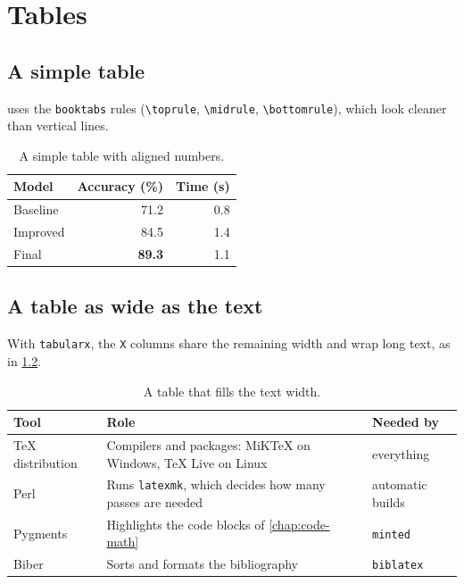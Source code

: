 \chapter{Tables}
\label{chap:tables}

\section{A simple table}

 uses the \texttt{booktabs} rules (\verb|\toprule|,
\verb|\midrule|, \verb|\bottomrule|), which look cleaner than vertical lines.

\begin{table}[H]
  \centering
  \begin{tabular}{lrr}
    \toprule
    \textbf{Model} & \textbf{Accuracy (\%)} & \textbf{Time (s)} \\
    \midrule
    Baseline     & 71.2 & 0.8 \\
    Improved     & 84.5 & 1.4 \\
    Final        & \textbf{89.3} & 1.1 \\
    \bottomrule
  \end{tabular}
  \caption{A simple table with aligned numbers.}
  \label{tab:simple}
\end{table}

\section{A table as wide as the text}

With \texttt{tabularx}, the \texttt{X} columns share the remaining width and
wrap long text, as in \cref{tab:wide}.

\begin{table}[H]
  \centering
  \begin{tabularx}{\linewidth}{l X l}
    \toprule
    \textbf{Tool} & \textbf{Role} & \textbf{Needed by} \\
    \midrule
    \TeX{} distribution & Compilers and packages: MiKTeX on Windows, \TeX{} Live on Linux & everything \\
    Perl & Runs \texttt{latexmk}, which decides how many passes are needed & automatic builds \\
    Pygments & Highlights the code blocks of \cref{chap:code-math} & \texttt{minted} \\
    Biber & Sorts and formats the bibliography & \texttt{biblatex} \\
    \bottomrule
  \end{tabularx}
  \caption{A table that fills the text width.}
  \label{tab:wide}
\end{table}

